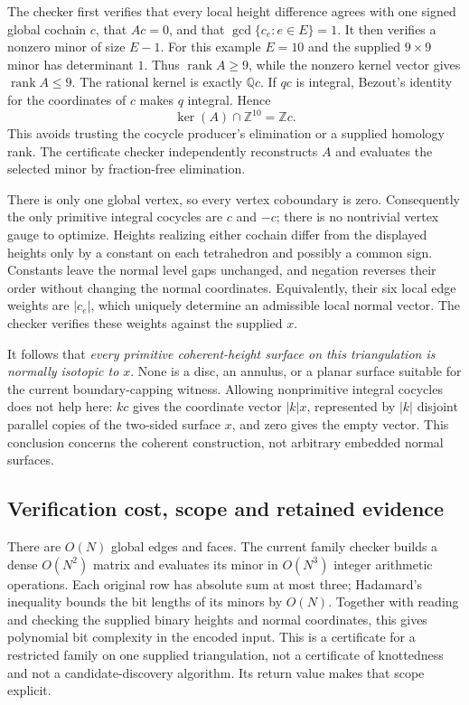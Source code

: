 The checker first verifies that every local height difference agrees with
one signed global cochain $c$, that $Ac=0$, and that
$\gcd\{c_e:e\in E\}=1$. It then verifies a nonzero minor of size $E-1$.
For this example $E=10$ and the supplied $9\times9$ minor has determinant
$1$. Thus $\operatorname{rank} A\ge9$, while the nonzero kernel vector gives
$\operatorname{rank} A\le9$. The rational kernel is exactly $\mathbb Q c$.
If $q c$ is integral, Bezout's identity for the coordinates of $c$ makes
$q$ integral. Hence
\[
 \ker(A)\cap\mathbb Z^{10}=\mathbb Zc.
\]
This avoids trusting the cocycle producer's elimination or a supplied
homology rank. The certificate checker independently reconstructs $A$ and
evaluates the selected minor by fraction-free elimination.

There is only one global vertex, so every vertex coboundary is zero.
Consequently the only primitive integral cocycles are $c$ and $-c$;
there is no nontrivial vertex gauge to optimize. Heights realizing either
cochain differ from the displayed heights only by a constant on each
tetrahedron and possibly a common sign. Constants leave the normal level
gaps unchanged, and negation reverses their order without changing the
normal coordinates. Equivalently, their six local edge weights are
$|c_e|$, which uniquely determine an admissible local normal vector.
The checker verifies these weights against the supplied $x$.

It follows that \emph{every primitive coherent-height surface on this
triangulation is normally isotopic to $x$}. None is a disc, an annulus, or a
planar surface suitable for the current boundary-capping witness. Allowing
nonprimitive integral cocycles does not help here: $kc$ gives the coordinate
vector $|k|x$, represented by $|k|$ disjoint parallel copies of the two-sided
surface $x$, and zero gives the empty vector. This conclusion concerns the
coherent construction, not arbitrary embedded normal surfaces.

\subsection{Verification cost, scope and retained evidence}

There are $O(N)$ global edges and faces. The current family checker builds
a dense $O(N^2)$ matrix and evaluates its minor in $O(N^3)$ integer
arithmetic operations. Each original row has absolute sum at most three;
Hadamard's inequality bounds the bit lengths of its minors by $O(N)$.
Together with reading and checking the supplied binary heights and normal
coordinates, this gives polynomial bit complexity in the encoded input.
This is a certificate for a restricted family on one supplied triangulation,
not a certificate of knottedness and not a candidate-discovery algorithm.
Its return value makes that scope explicit.

